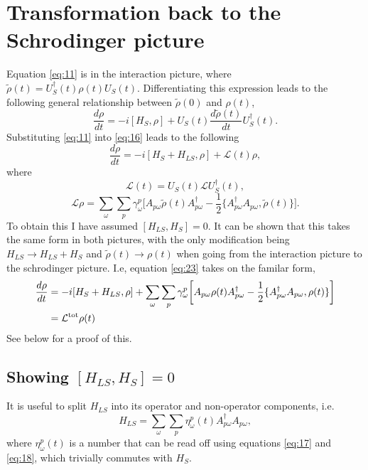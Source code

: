 \documentclass[10pt]{article}
\numberwithin{equation}{section}
\begin{document}
\section{Transformation back to the Schrodinger picture}
 Equation \ref{eq:11} is in the interaction picture, where $\tilde{\rho}(t) =  U^{\dagger}_{S}(t)\rho(t)U_{S}(t)$. Differentiating this expression leads to the following general relationship between $\tilde{\rho}(0)$ and $\rho(t)$,
\begin{equation} \label{eq:16}
\frac{d\rho}{dt} = -i[H_{S},\rho] + U_{S}(t)\frac{d\tilde{\rho}(t)}{dt}U^{\dagger}_{S}(t).
\end{equation}
Substituting \ref{eq:11} into \ref{eq:16} leads to the following
\begin{equation}\label{eq:23}
\frac{d\rho}{dt} = -i[H_{S}+H_{LS},\rho] +\mathcal{L}(t)\rho,
\end{equation}
where 
\begin{equation}
\mathcal{L}(t) = U_{S}(t)\mathcal{L} U^{\dagger}_{S}(t),
\end{equation}
\begin{equation}
\mathcal{L}\rho =  \sum_{\omega}\sum_{p}\gamma_{\omega}^{p} \bigg[A_{p\omega}\tilde{\rho}(t)A_{p\omega}^{\dagger} - \frac{1}{2}\{A_{p\omega}^{\dagger}A_{p\omega},\tilde{\rho}(t)\}\bigg].
\end{equation}
To obtain this I have assumed $[H_{LS},H_{S}] = 0$. It can be shown that this takes the same form in both pictures, with the only modification being $H_{LS}\rightarrow H_{LS}+H_{S}$ and $\tilde{\rho}(t)\rightarrow\rho(t)$ when going from the interaction picture to the schrodinger picture. I.e, equation \ref{eq:23} takes on the familar form,
\begin{align}
\frac{d\rho}{dt} &= -i[H_{S}+H_{LS},\rho] + \sum_{\omega}\sum_{p}\gamma_{\omega}^{p} \bigg[A_{p\omega}\rho(t)A_{p\omega}^{\dagger} - \frac{1}{2}\{A_{p\omega}^{\dagger}A_{p\omega},\rho(t)\}\bigg] \\
&= \mathcal{L}^{\rm tot}\rho(t)
\end{align}
See below for a proof of this.
\newpage






\subsection{Showing  $[H_{LS},H_{S}] = 0$}
It is useful to split $H_{LS}$ into its operator and non-operator components, i.e.
\begin{equation}
H_{LS} =   \sum_{\omega}\sum_{p}\eta_{\omega}^{p}(t) A_{p\omega}^{\dagger}A_{p\omega},
\end{equation}
where $\eta_{\omega}^{p}(t)$ is a number that can be read off using equations \ref{eq:17} and \ref{eq:18}, which trivially commutes with $H_{S}$. 
\end{document}
